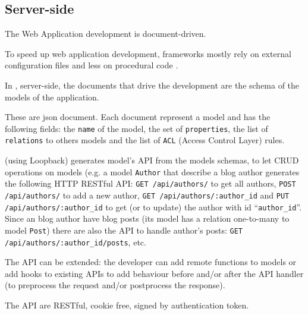 


\subsection{Server-side}
The Web Application development is document-driven.

To speed up web application development, frameworks mostly rely on external configuration files and less on procedural code \cite{6859693}.


In , server-side, the documents that drive the development are the schema of the models of the application.


These are json document. Each document represent a model and has the following fields: the \texttt{name} of the model, the set of \texttt{properties}, the list of \texttt{relations} to others models and the list of \texttt{ACL} (Access Control Layer) rules. 

 (using Loopback) generates model’s API from the models schemas, to let CRUD operations on models (e.g. a model \texttt{Author} that describe a blog author generates the following HTTP RESTful API: \texttt{GET /api/authors/} to get all authors, \texttt{POST /api/authors/} to add a new author, \texttt{GET /api/authors/:author\_id} and \texttt{PUT /api/authors/:author\_id} to get (or to update) the author with id ``\texttt{author\_id}''. 
Since an blog author have blog posts (its model has a relation one-to-many to model \texttt{Post}) there are also the API to handle author's posts: \texttt{GET /api/authors/:author\_id/posts}, etc.

The API can be extended: the developer can add remote functions to models or add hooks to existing APIs to add behaviour before and/or after the API handler (to preprocess the request and/or postprocess the response).

The API are RESTful, cookie free, signed by authentication token.


